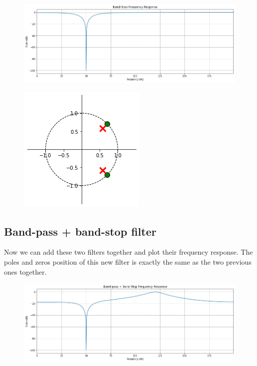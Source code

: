 \documentclass[]{article}
\begin{document}
\begin{figure}[H]
    \centering
    \includegraphics[scale=0.5]{q14.png}
\end{figure}

\begin{figure}[H]
    \centering
    \includegraphics[scale=0.7]{q17.png}
\end{figure}

\pagebreak

\subsection*{Band-pass + band-stop filter}

Now we can add these two filters together and plot their frequency response. 
The poles and zeros position of this new filter is exactly the same as the two previous ones together.

\begin{figure}[H]
    \centering
    \includegraphics[scale=0.5]{q15.png}
\end{figure}
\end{document}
